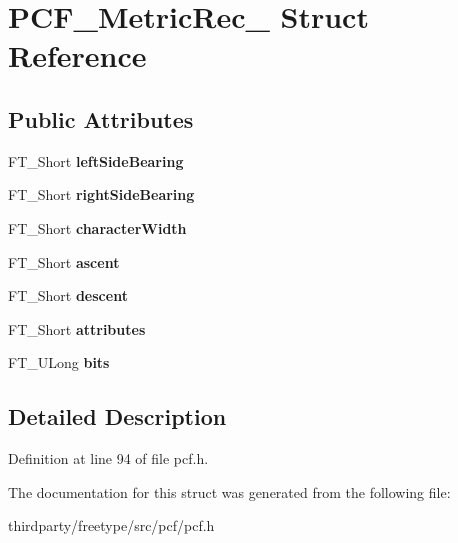\hypertarget{struct_p_c_f___metric_rec__}{}\section{P\+C\+F\+\_\+\+Metric\+Rec\+\_\+ Struct Reference}
\label{struct_p_c_f___metric_rec__}
\subsection*{Public Attributes}
\begin{DoxyCompactItemize}
\item 
\mbox{\label{struct_p_c_f___metric_rec___a2aad06aa95e7ed8224e798568a8c67b4}} 
F\+T\+\_\+\+Short {\bfseries left\+Side\+Bearing}
\item 
\mbox{\label{struct_p_c_f___metric_rec___a9467aee2a6fde65f71b2748ac4ac634d}} 
F\+T\+\_\+\+Short {\bfseries right\+Side\+Bearing}
\item 
\mbox{\label{struct_p_c_f___metric_rec___a121fbf02ee1dae3753b4f32af097eb9c}} 
F\+T\+\_\+\+Short {\bfseries character\+Width}
\item 
\mbox{\label{struct_p_c_f___metric_rec___a577fb99014992e7745a7aabc089afe30}} 
F\+T\+\_\+\+Short {\bfseries ascent}
\item 
\mbox{\label{struct_p_c_f___metric_rec___aa0e788e33d353f08320d33a1c6d4b697}} 
F\+T\+\_\+\+Short {\bfseries descent}
\item 
\mbox{\label{struct_p_c_f___metric_rec___a04beeeaff10a6892d115ef188a687745}} 
F\+T\+\_\+\+Short {\bfseries attributes}
\item 
\mbox{\label{struct_p_c_f___metric_rec___af154186a935817fa06101885e74fd266}} 
F\+T\+\_\+\+U\+Long {\bfseries bits}
\end{DoxyCompactItemize}


\subsection{Detailed Description}


Definition at line 94 of file pcf.\+h.



The documentation for this struct was generated from the following file\+:\begin{DoxyCompactItemize}
\item 
thirdparty/freetype/src/pcf/pcf.\+h\end{DoxyCompactItemize}

